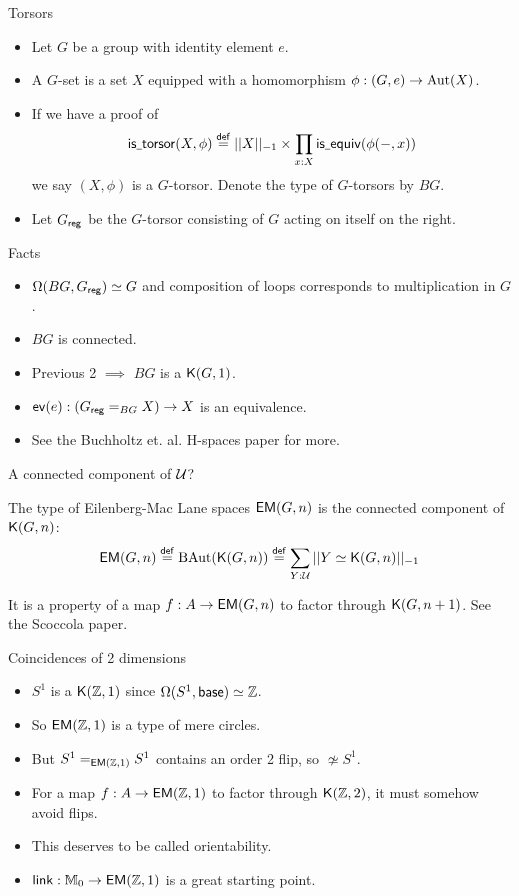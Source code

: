 \documentclass[14pt,aspectratio=169]{beamer}
\renewcommand{\defemph}[1]{\alert{#1}}
\begin{document}
\begin{frame}{Torsors}
\begin{definition}
\begin{itemize}
\item Let \( G \) be a group with identity element \( e \).
\item A \defemph{\( G \)-set} is a set \( X \) equipped with a homomorphism \( \phi:(G,e)\to\operatorname{Aut}(X) \).
\item If we have a proof of
\[ 
\mathsf{is\underscore torsor}(X,\phi)\defeq ||X||_{-1}\times \pit{x:X}\mathsf{is\underscore equiv}(\phi(-,x))
\] we say \( (X,\phi) \) is a \defemph{\( G \)-torsor}. Denote the type of \( G \)-torsors by \alert{\( BG \)}.
\item Let \( {G}_{\mathsf{reg}} \) be the \( G \)-torsor consisting of \( G \) acting on itself on the right.
\end{itemize}
\end{definition}
\end{frame}

\begin{frame}{Facts}
\begin{itemize}
\item \( \Omega(BG,{G}_{\mathsf{reg}}) \simeq G \) and composition of loops corresponds to multiplication in \( G \).
\item \( BG \) is connected.
\item Previous 2 \( \implies \) \( BG \) is a \( \mathsf{K}(G,1) \).
\item \( \mathsf{ev}(e):({G}_{\mathsf{reg}}=_{BG} X)\to X \) is an equivalence.
\item See the Buchholtz et. al. H-spaces paper for more.
\end{itemize}
\end{frame}

\begin{frame}{A connected component of \( \mathcal{U} \)?}
\begin{definition}
The \alert{type of Eilenberg-Mac Lane spaces \( \mathsf{EM}(G,n) \)} is the connected component of \( \mathsf{K}(G,n) \):
\[ \mathsf{EM}(G,n)\stackrel{\mathsf{def}}{=} \operatorname{BAut}(\mathsf{K}(G,n))\stackrel{\mathsf{def}}{=} \sum_{Y:\mathcal{U}}||Y\simeq \mathsf{K}(G,n)||_{-1} \]
\end{definition}
It is a property of a map \( f:A\to\mathsf{EM}(G,n) \) to factor through \( \mathsf{K}(G,n+1) \). See the Scoccola paper.
\end{frame}

\begin{frame}{Coincidences of 2 dimensions}
\begin{itemize}
\item \( S^1 \) is a \( \mathsf{K}(\mathbb{Z},1) \) since \( \Omega(S^1, \mathsf{base})\simeq \mathbb{Z} \).
\item So \( \mathsf{EM}(\mathbb{Z},1) \) is a type of \alert{mere circles}.
\item But \( S^1=_{\mathsf{EM}(\mathbb{Z},1)}S^1 \) contains an order 2 \alert{flip}, so \( \not\simeq S^1 \).
\item For a map \( f:A\to\mathsf{EM}(\mathbb{Z},1) \) to factor through  \( \mathsf{K}(\mathbb{Z},2) \), it must somehow avoid flips.
\item This deserves to be called \alert{orientability}.
\item \( \operatorname{\mathsf{link}}:\mathbb{M}_0\to\mathsf{EM}(\mathbb{Z},1) \) is a great starting point.
\end{itemize}
\end{frame}
\end{document}
